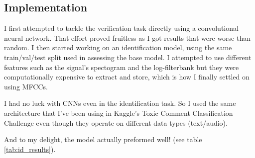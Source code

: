 \documentclass{article}
\begin{document}
\subsection{Implementation} \label{implementation}
I first attempted to tackle the verification task directly using a convolutional neural network. That effort proved fruitless as I got results that were worse than random. I then started working on an identification model, using the same train/val/test split used in assessing the base model. I attempted to use different features such as the signal's spectogram and the log-filterbank but they were computationally expensive to extract and store, which is how I finally settled on using MFCCs.

I had no luck with CNNs even in the identification task. So I used the same architecture that I've been using in Kaggle's Toxic Comment Classification Challenge even though they operate on different data types (text/audio).

And to my delight, the model actually preformed well! (see table \ref{tab:id_results}).
\end{document}
